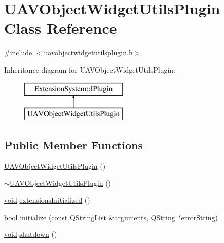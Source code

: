 \hypertarget{class_u_a_v_object_widget_utils_plugin}{\section{\-U\-A\-V\-Object\-Widget\-Utils\-Plugin \-Class \-Reference}
\label{class_u_a_v_object_widget_utils_plugin}
}


{\ttfamily \#include $<$uavobjectwidgetutilsplugin.\-h$>$}

\-Inheritance diagram for \-U\-A\-V\-Object\-Widget\-Utils\-Plugin\-:\begin{figure}[H]
\begin{center}
\leavevmode
\includegraphics[height=2.000000cm]{class_u_a_v_object_widget_utils_plugin}
\end{center}
\end{figure}
\subsection*{\-Public \-Member \-Functions}
\begin{DoxyCompactItemize}
\item 
\hyperlink{group___u_a_v_object_widget_utils_ga71c193fdd4f73fd349dbb72db72a1d05}{\-U\-A\-V\-Object\-Widget\-Utils\-Plugin} ()
\item 
\hyperlink{group___u_a_v_object_widget_utils_ga2c7561526e629a5fcaa9bf2def2a4b8c}{$\sim$\-U\-A\-V\-Object\-Widget\-Utils\-Plugin} ()
\item 
\hyperlink{group___u_a_v_objects_plugin_ga444cf2ff3f0ecbe028adce838d373f5c}{void} \hyperlink{group___u_a_v_object_widget_utils_ga8538f7844616deeef2455da33bc8a9fe}{extensions\-Initialized} ()
\item 
bool \hyperlink{group___u_a_v_object_widget_utils_ga7a913580e5284f9291cab68f3bfed4a3}{initialize} (const \-Q\-String\-List \&arguments, \hyperlink{group___u_a_v_objects_plugin_gab9d252f49c333c94a72f97ce3105a32d}{\-Q\-String} $\ast$error\-String)
\item 
\hyperlink{group___u_a_v_objects_plugin_ga444cf2ff3f0ecbe028adce838d373f5c}{void} \hyperlink{group___u_a_v_object_widget_utils_ga672bbb620f7be71610e6adc36d5ca0b9}{shutdown} ()
\end{DoxyCompactItemize}


